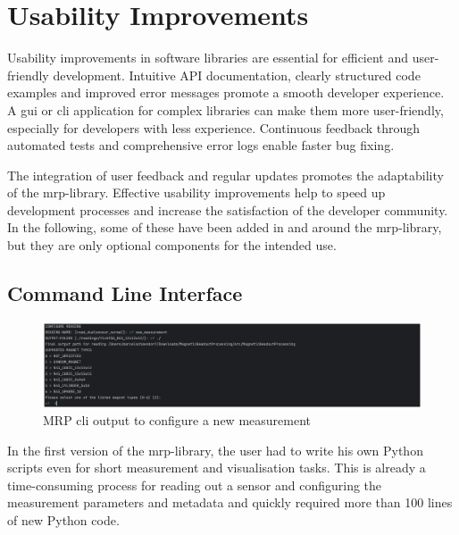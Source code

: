 \hypertarget{usability-improvements}{%
\chapter{Usability Improvements}\label{usability-improvements}}

Usability improvements in software libraries are essential for efficient
and user-friendly development. Intuitive API documentation, clearly
structured code examples and improved error messages promote a smooth
developer experience. A \gls{gui} or \gls{cli} application for complex
libraries can make them more user-friendly, especially for developers
with less experience. Continuous feedback through automated tests and
comprehensive error logs enable faster bug fixing.

The integration of user feedback and regular updates promotes the
adaptability of the \gls{mrp}-library. Effective usability improvements
help to speed up development processes and increase the satisfaction of
the developer community. In the following, some of these have been added
in and around the \gls{mrp}-library, but they are only optional
components for the intended use.

\hypertarget{command-line-interface}{%
\section{Command Line Interface}\label{command-line-interface}}

\begin{figure}
\centering
\includegraphics{./generated_images/border_MRP_(+cli)_output_to_configure_a_new_measurement.png}
\caption{MRP \gls{cli} output to configure a new measurement
\label{MRP_(+cli)_output_to_configure_a_new_measurement.png}}
\end{figure}

In the first version of the \gls{mrp}-library, the user had to write his
own Python scripts even for short measurement and visualisation tasks.
This is already a time-consuming process for reading out a sensor and
configuring the measurement parameters and metadata and quickly required
more than 100 lines of new Python code.

